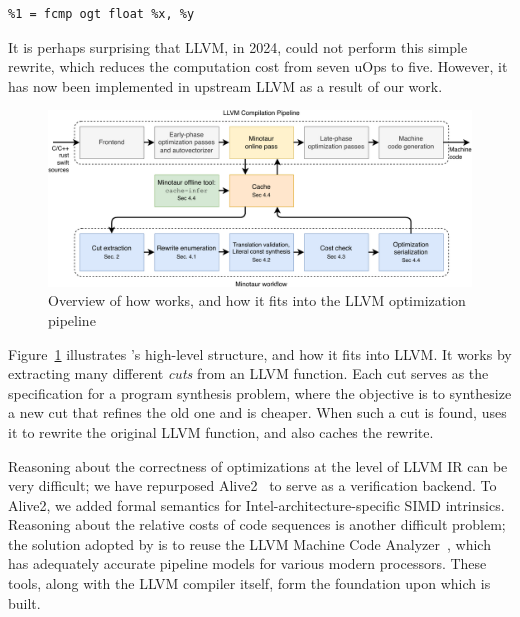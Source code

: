 {\begin{quoting}\begin{Verbatim}
%1 = fcmp ogt float %x, %y
\end{Verbatim}
\end{quoting}}

It is perhaps surprising that LLVM, in 2024, could not perform this
simple rewrite, which reduces the computation cost from seven uOps to
five.
%
However, it has now been implemented in upstream LLVM as a result of
our work.

\begin{figure}[tbp]
    \includegraphics[width=\linewidth]{figures/flowchart.pdf}
    \caption{Overview of how \minotaur{} works, and how it fits into the
      LLVM optimization pipeline}
    \label{fig:workflow}
\end{figure}

Figure~\ref{fig:workflow} illustrates \minotaur's high-level structure,
and how it fits into LLVM\@.
%
It works by extracting many different \textit{cuts} from an LLVM function.
%
Each cut serves as the specification for a program synthesis
problem, where the objective is to synthesize a new cut that refines
the old one and is cheaper.
%
When such a cut is found, \minotaur{} uses it to rewrite the original
LLVM function, and also caches the rewrite.


Reasoning about the correctness of optimizations at the level of LLVM
IR can be very difficult; we have repurposed Alive2~\cite{alive2} to
serve as a verification backend.
%
To Alive2, we added formal semantics for Intel-architecture-specific
SIMD intrinsics.
%
Reasoning about the relative costs of code sequences is another
difficult problem; the solution adopted by \minotaur{} is to reuse the
LLVM Machine Code Analyzer~\cite{llvmmca}, which has adequately
accurate pipeline models for various modern processors.
%
These tools, along with the LLVM compiler itself, form the
foundation upon which \minotaur{} is built.


